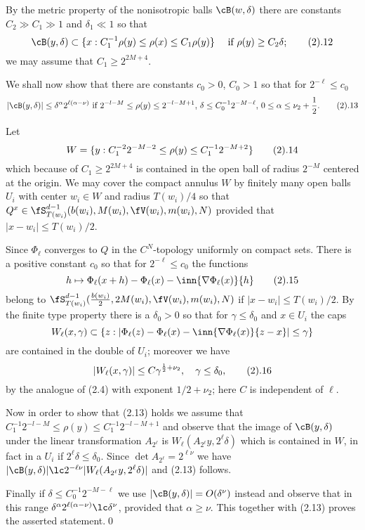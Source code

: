 By the metric property of the nonisotropic  balls $\cB(w,\delta)$ there are 
constants $C_2\gg C_1\gg 1$ and $\delta_1\ll 1$ so that
$$
\cB(y,\delta)\subset \{ x: C_1^{-1}\rho(y)\le\rho(x)\le  C_1\rho(y)\}
\quad \text{ if } \rho(y)\ge C_2\delta; 
\tag 2.12
$$
we may assume that $C_1\ge 2^{2M+4}$.

We shall now show that there are constants $c_0>0$, $C_0>1$ so that
 for $2^{-\ell}\le c_0$
$$
|\cB(y,\delta)|\le \delta^\alpha 2^{\ell(\alpha-\nu)} 
\text { if } 2^{-l-M}\le \rho(y)\le 2^{-l-M+1},  \,
\delta\le C_0^{-1} 2^{-M-\ell}, \,
0\le \alpha\le \nu_2+\frac 1 2. 
\tag 2.13
$$

Let $$W=\{y: C_1^{-2} 2^{-M-2}\le \rho(y)\le C_1^{-1}  2^{-M+2}\}
\tag 2.14$$
which because of
$C_1\ge 2^{2M+4}$
 is contained in the open 
ball of radius $2^{-M}$ centered at the origin.
 We may cover the compact 
annulus $W$ by finitely many open balls $U_i$ with  center $w_i\in W$ and radius $T(w_i)/4$
 so that
$Q^x\in \fS_{T(w_i)}^{d-1}(b(w_i),M(w_i),\fV(w_i), m(w_i),N)$  provided that 
$|x-w_i|\le T(w_i)/2$.

Since $\Phi_\ell$ converges to $Q$ 
in the $C^N$-topology uniformly on compact sets. There  
is a positive constant $c_0$ so that for $2^{-\ell}\le c_0$
the functions 
$$h\mapsto \Phi_\ell(x+h)-\Phi_\ell(x)-\inn{\nabla\Phi_\ell(x)}{h}
\tag 2.15
$$
belong to
$\fS_{T(w_i)}^{d-1}(\tfrac{b(w_i)}2,2M(w_i),\fV(w_i), m(w_i),N)$  if $|x-w_i|\le T(w_i)/2$.
By the finite type property there is a $\delta_0>0$ so that for $\gamma\le \delta_0$  and 
$x\in U_i$
the caps 
$$
W_\ell(x,\gamma) \subset 
\{z:|\Phi_\ell(z)-\Phi_\ell(x)-\inn{\nabla\Phi_\ell(x)}{z-x}|\le \gamma\}
$$ are contained in the double  of $U_i$; moreover we have
$$
|W_\ell(x,\gamma)|\le C \gamma^{\frac 12+\nu_2}, \quad \gamma\le \delta_0,
\tag 2.16
$$
by the analogue of (2.4) with exponent $1/2+\nu_2$; here $C$ is independent of $\ell$.

Now in order to show that
(2.13) holds
we assume that
$ C_1^{-1}2^{-l-M}\le \rho(y)\le C_1^{-1}2^{-l-M+1} $ 
and observe that
the image of $\cB(y,\delta)$ under the linear transformation $A_{2^\ell}$ is 
$W_\ell(A_{2^\ell}y,2^\ell\delta)$ which is contained in $W$, in fact in a $U_i$ if 
$2^\ell\delta\le \delta_0$.
Since  $\det A_{2^\ell}=2^{\ell\nu}$
we have $|\cB(y,\delta)|\lc 2^{-\ell\nu}|W_\ell(A_{2^\ell}y,2^\ell\delta)|$ and (2.13) follows.

Finally if
$\delta\le C_0^{-1} 2^{-M-\ell}$ we use 
$|\cB(y,\delta)|=O(\delta^\nu)$ instead and observe  that in this range
$\delta^\alpha 2^{\ell(\alpha-\nu)}\lc \delta^\nu$, provided that $\alpha\ge \nu$. This together with (2.13) proves the asserted statement.\qed
\enddemo

